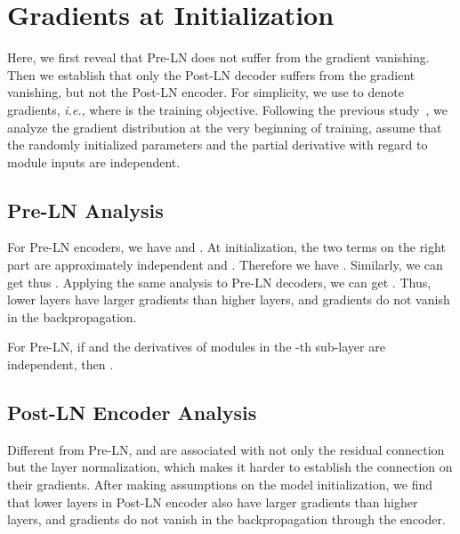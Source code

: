 \documentclass[11pt,a4paper]{article}
\newcommand{\ie}{\textit{i.e.}}
\begin{document}
\setcounter{theorem}{0}    


\section{Gradients at Initialization}
\label{appendix:ini_grad}

Here, we first reveal that Pre-LN does not suffer from the gradient vanishing. 
Then we establish that only the Post-LN decoder suffers from the gradient vanishing, but not the Post-LN encoder. 
For simplicity, we use  to denote gradients, \ie,  where  is the training objective. 
Following the previous study~\cite{Bengio1994LearningLD,Glorot2010UnderstandingTD,He2015DelvingDI,saxe2013exact}, we analyze the gradient distribution at the very beginning of training, assume that the randomly initialized parameters and the partial derivative with regard to module inputs are independent.


\subsection{Pre-LN Analysis}
\label{subsec:preln-analysis}
For Pre-LN encoders, we have 
 and
. 
At initialization, the two terms on the right part are approximately independent and . Therefore we have .
Similarly, we can get  thus . 
Applying the same analysis to Pre-LN decoders, we can get .
Thus, lower layers have larger gradients than higher layers, and gradients do not vanish in the backpropagation. 
\begin{remark}
For Pre-LN, if  and the derivatives of modules in the -th sub-layer are independent, then .
\label{remark: pre-ln-gradient}
\end{remark}


\subsection{Post-LN Encoder Analysis}
\label{subsec:postln-encoder-analysis}
Different from Pre-LN,  and  are associated with not only the residual connection but the layer normalization, which makes it harder to establish the connection on their gradients.
After making assumptions on the model initialization, we find that lower layers in Post-LN encoder also have larger gradients than higher layers, and gradients do not vanish in the backpropagation through the encoder.   
\end{document}
